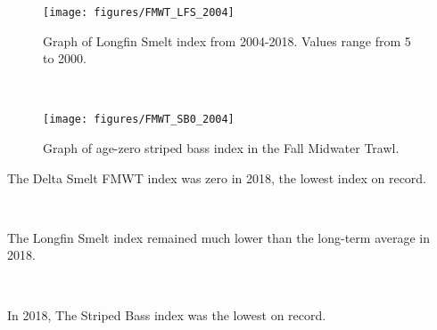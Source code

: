 \documentclass[
]{book}
\begin{document}
\begin{panel-grid}
\begin{columns-nocenter}
\begin{column800}
\begin{expand}

\begin{figure}
\texttt{[image: figures/FMWT\_LFS\_2004]} \caption{Graph of Longfin Smelt index from 2004-2018. Values range from 5 to 2000.}\label{fig:unnamed-chunk-140}
\end{figure}

\end{expand}

\end{column800}

\begin{column40}

~

\end{column40}

\begin{column800}

\begin{expand}

\begin{figure}
\texttt{[image: figures/FMWT\_SB0\_2004]} \caption{Graph of age-zero striped bass index in the Fall Midwater Trawl.}\label{fig:unnamed-chunk-141}
\end{figure}

\end{expand}

\end{column800}

\end{columns-nocenter}

\begin{columns-nocenter}

\begin{column800}

The Delta Smelt FMWT index was zero in 2018, the lowest index on record.

\end{column800}

\begin{column40}

~

\end{column40}

\begin{column800}

The Longfin Smelt index remained much lower than the long-term average in 2018.

\end{column800}

\begin{column40}

~

\end{column40}

\begin{column800}

In 2018, The Striped Bass index was the lowest on record.

\end{column800}

\end{columns-nocenter}

\end{panel-grid}
\end{document}
